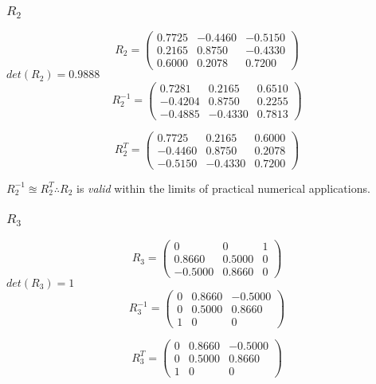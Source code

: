 		\pagebreak
		\subsubsection{$R_{2}$}
			$$
			R_{2} =
			\begin{pmatrix}
				0.7725 & -0.4460 & -0.5150\\
				0.2165 & 0.8750 & -0.4330\\
				0.6000  & 0.2078  & 0.7200
			\end{pmatrix}
			$$
			\hspace{35mm}$det(R_{2}) = 0.9888$
			\\
			$$
			R_{2}^{-1} =
			\begin{pmatrix}
				0.7281 & 0.2165 & 0.6510\\
				-0.4204 & 0.8750 & 0.2255\\
				-0.4885  & -0.4330  & 0.7813
			\end{pmatrix}
			$$
					
			$$
			R_{2}^{T} =
			\begin{pmatrix}
				0.7725 & 0.2165 & 0.6000\\
				-0.4460 & 0.8750 & 0.2078\\
				-0.5150  & -0.4330  & 0.7200
			\end{pmatrix}
			$$
			
			$R_{2}^{-1} \approxeq R_{2}^{T}\therefore R_{2}$ is \emph{valid} within the limits of practical numerical applications.
			
		\subsubsection{$R_{3}$}
			$$
			R_{3} =
			\begin{pmatrix}
				0 & 0 & 1\\
				0.8660 & 0.5000 & 0\\
				-0.5000  & 0.8660  & 0
			\end{pmatrix}
			$$
			\hspace{35mm}$det(R_{3}) = 1$
			\\
			$$
			R_{3}^{-1} =
			\begin{pmatrix}
				0 & 0.8660 & -0.5000\\
				0 & 0.5000 & 0.8660\\
				1  & 0  & 0
			\end{pmatrix}
			$$
		
			$$
			R_{3}^{T} =
			\begin{pmatrix}
				0 & 0.8660 & -0.5000\\
				0 & 0.5000 & 0.8660\\
				1  & 0  & 0
			\end{pmatrix}
			$$
		

